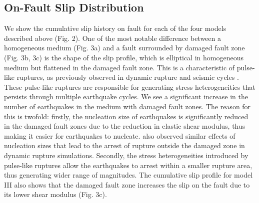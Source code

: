 \documentclass[11pt]{article}
\begin{document}
\subsection{On-Fault Slip Distribution}
We show the cumulative slip history on fault for each of the four models described above (Fig. 2). One of the most notable difference between a homogeneous medium (Fig. 3a) and a fault surrounded by damaged fault zone (Fig. 3b, 3c) is the shape of the slip profile, which is elliptical in homogeneous medium but flattened in the damaged fault zone. This is a characteristic of pulse-like ruptures, as previously observed in dynamic rupture \citep{huang_ampuero_2011, huang_2014} and seismic cycles \citep{michel_2017}. These pulse-like ruptures are responsible for generating stress heterogeneities that persists through multiple earthquake cycles. We see a significant increase in the number of earthquakes in the medium with damaged fault zones. The reason for this is twofold: firstly, the nucleation size of earthquakes is significantly reduced in the damaged fault zones due to the reduction in elastic shear modulus, thus making it easier for earthquakes to nucleate. \citet{huang_2018} also observed similar effects of nucleation sizes that lead to the arrest of rupture outside the damaged zone in dynamic rupture simulations. Secondly, the stress heterogeneities introduced by pulse-like ruptures allow the earthquakes to arrest within a smaller rupture area, thus generating wider range of magnitudes. The cumulative slip profile for model III  also shows that the damaged fault zone increases the slip on the fault due to its lower shear modulus (Fig. 3c).
\end{document}
